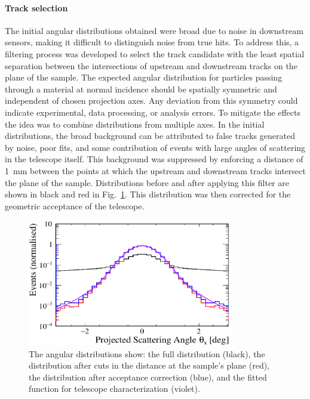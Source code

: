 \begin{refsection}
        \paragraph{Track selection}
        The initial angular distributions obtained were broad due to noise in downstream sensors, making it difficult to distinguish noise from true hits. 
        To address this, a filtering process was developed to select the track candidate with the least spatial separation between the intersections of upstream and downstream tracks on the plane of the sample.
        The expected angular distribution for particles passing through a material at normal incidence should be spatially symmetric and independent of chosen projection axes. 
        Any deviation from this symmetry could indicate experimental, data processing, or analysis errors. 
        To mitigate the effects the idea was to combine distributions from multiple axes.
        In the initial distributions, the broad background can be attributed to false tracks generated by noise, poor fits, and some contribution of events with large angles of scattering in the telescope itself. 
        This background was suppressed by enforcing a distance of \SI{1}{mm} between the points at which the upstream and downstream tracks intersect the plane of the sample.
        Distributions before and after applying this filter are shown in black and red in Fig.~\ref{fig:muEDM:bt2021:distributions}.
        This distribution was then corrected for the geometric acceptance of the telescope.
        
        \begin{figure}
            \centering
            \includegraphics[width=0.8\textwidth]{Figures/muEDM_Dec2021/distributions.png}
            \caption[muEDM 2021: angular with corrections]{The angular distributions show: the full distribution (black), the distribution after cuts in the distance at the sample's plane (red), the distribution after acceptance correction (blue), and the fitted function for telescope characterization (violet).}
            \label{fig:muEDM:bt2021:distributions}
        \end{figure}
        

\end{refsection}
